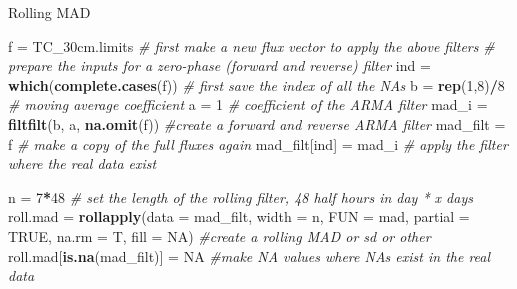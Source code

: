\documentclass[
]{article}
\newenvironment{Shaded}{\begin{snugshade}}{\end{snugshade}}
\newcommand{\AttributeTok}[1]{\textcolor[rgb]{0.13,0.29,0.53}{#1}}
\newcommand{\CommentTok}[1]{\textcolor[rgb]{0.56,0.35,0.01}{\textit{#1}}}
\newcommand{\ConstantTok}[1]{\textcolor[rgb]{0.56,0.35,0.01}{#1}}
\newcommand{\DecValTok}[1]{\textcolor[rgb]{0.00,0.00,0.81}{#1}}
\newcommand{\FunctionTok}[1]{\textcolor[rgb]{0.13,0.29,0.53}{\textbf{#1}}}
\newcommand{\NormalTok}[1]{#1}
\newcommand{\OtherTok}[1]{\textcolor[rgb]{0.56,0.35,0.01}{#1}}
\newcommand{\SpecialCharTok}[1]{\textcolor[rgb]{0.81,0.36,0.00}{\textbf{#1}}}
\begin{document}
Rolling MAD

\begin{Shaded}
\begin{Highlighting}[]
\NormalTok{f }\OtherTok{=}\NormalTok{ TC\_30cm.limits }\CommentTok{\# first make a new flux vector to apply the above filters}
\CommentTok{\# prepare the inputs for a zero{-}phase (forward and reverse) filter  }
\NormalTok{ind       }\OtherTok{=} \FunctionTok{which}\NormalTok{(}\FunctionTok{complete.cases}\NormalTok{(f))   }\CommentTok{\# first save the index of all the NAs}
\NormalTok{b         }\OtherTok{=} \FunctionTok{rep}\NormalTok{(}\DecValTok{1}\NormalTok{,}\DecValTok{8}\NormalTok{)}\SpecialCharTok{/}\DecValTok{8}                 \CommentTok{\# moving average coefficient}
\NormalTok{a         }\OtherTok{=} \DecValTok{1}                          \CommentTok{\# coefficient of the ARMA filter}
\NormalTok{mad\_i    }\OtherTok{=} \FunctionTok{filtfilt}\NormalTok{(b, a, }\FunctionTok{na.omit}\NormalTok{(f)) }\CommentTok{\#create a forward and reverse ARMA filter}
\NormalTok{mad\_filt }\OtherTok{=}\NormalTok{ f                          }\CommentTok{\# make a copy of the full fluxes again}
\NormalTok{mad\_filt[ind] }\OtherTok{=}\NormalTok{ mad\_i                }\CommentTok{\# apply the filter where the real data exist}

\NormalTok{n }\OtherTok{=} \DecValTok{7}\SpecialCharTok{*}\DecValTok{48} \CommentTok{\# set the length of the rolling filter, 48 half hours in day * x days}
\NormalTok{roll.mad }\OtherTok{=} \FunctionTok{rollapply}\NormalTok{(}\AttributeTok{data =}\NormalTok{ mad\_filt,}
                     \AttributeTok{width =}\NormalTok{ n,}
                     \AttributeTok{FUN =}\NormalTok{ mad,}
                     \AttributeTok{partial =} \ConstantTok{TRUE}\NormalTok{,}
                     \AttributeTok{na.rm =}\NormalTok{ T,}
                     \AttributeTok{fill =} \ConstantTok{NA}\NormalTok{)  }\CommentTok{\#create a rolling MAD or sd or other}
\NormalTok{roll.mad[}\FunctionTok{is.na}\NormalTok{(mad\_filt)] }\OtherTok{=} \ConstantTok{NA}  \CommentTok{\#make NA values where NAs exist in the real data}


\end{Highlighting}
\end{Shaded}
\end{document}
